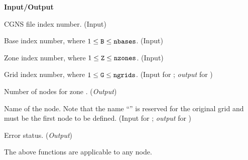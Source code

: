 \noindent
\textbf{\textcolor{input}{Input}/\textcolor{output}{Output}}

\begin{Ventryi}{}\raggedright
\item [\fort{fn}]
      CGNS file index number.
      (\textcolor{input}{Input})
\item [\fort{B}]
      Base index number, where $1 \leq \text{{\normalfont\texttt{B}}} \leq \text{{\normalfont\texttt{nbases}}}$.
      (\textcolor{input}{Input})
\item [\fort{Z}]
      Zone index number, where $1 \leq \text{{\normalfont\texttt{Z}}} \leq \text{{\normalfont\texttt{nzones}}}$.
      (\textcolor{input}{Input})
\item [\fort{G}]
      Grid index number, where $1 \leq \text{{\normalfont\texttt{G}}} \leq \text{{\normalfont\texttt{ngrids}}}$.
      (\textcolor{input}{Input} for ;
      \textcolor{output}{\textit{output}} for )
\item [\fort{ngrids}]
      Number of  nodes for zone .
      (\textcolor{output}{\textit{Output}})
\item [\fort{GridCoordinateName}]
      Name of the  node.
      Note that the name ``'' is reserved for the
      original grid and must be the first 
      node to be defined.
      (\textcolor{input}{Input} for ;
      \textcolor{output}{\textit{output}} for )
\item [\fort{ier}]
      Error status.
      (\textcolor{output}{\textit{Output}})
\end{Ventryi}

The above functions are applicable to any  node.

